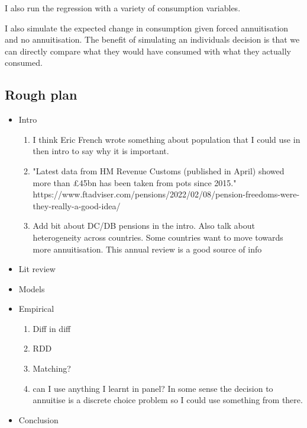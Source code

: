 \documentclass[12pt]{article}
\begin{document}
I also run the regression with a variety of consumption variables.

I also simulate the expected change in consumption given forced annuitisation and no annuitisation.
The benefit of simulating an individuals decision is that we can directly compare what they would have
consumed with what they actually consumed.

\subsection{Rough plan}
\begin{itemize}
  \item Intro
        \begin{enumerate}
          \item I think Eric French wrote something about population that I could use in then intro to say why it is important.
          \item "Latest data from HM Revenue Customs (published in April) showed more than £45bn has been taken from pots since 2015."
                https://www.ftadviser.com/pensions/2022/02/08/pension-freedoms-were-they-really-a-good-idea/


          \item Add bit about DC/DB pensions in the intro. Also talk about heterogeneity across countries.
                Some countries want to move towards more annuitisation. This annual review is a good source of info
                \cite{banks_crawford_ar_2022}
        \end{enumerate}
  \item Lit review
  \item Models
  \item Empirical
        \begin{enumerate}
          \item Diff in diff
          \item RDD
          \item Matching?
          \item can I use anything I learnt in panel?
                In some sense the decision to annuitise is a discrete choice problem so I could use something from there.
        \end{enumerate}
  \item Conclusion
\end{itemize}




\end{document}
